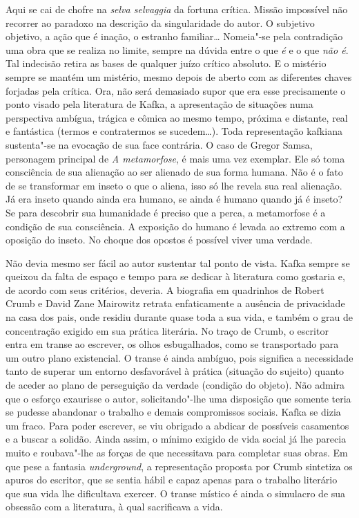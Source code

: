Aqui se cai de chofre na \textit{selva selvaggia} da fortuna crítica.
Missão impossível não recorrer ao paradoxo na descrição da
singularidade do autor. O subjetivo objetivo, a ação que é inação, o
estranho familiar\ldots{} Nomeia"-se pela contradição uma obra que se
realiza no limite, sempre na dúvida entre o que \textit{é} e o que
\textit{não é}. Tal indecisão retira as bases de qualquer juízo crítico
absoluto. E o mistério sempre se mantém um mistério, mesmo depois de
aberto com as diferentes chaves forjadas pela crítica. Ora, não será
demasiado supor que era esse precisamente o ponto visado pela
literatura de Kafka, a apresentação de situações numa perspectiva
ambígua, trágica e cômica ao mesmo tempo, próxima e distante, real e
fantástica (termos e contratermos se sucedem\ldots{}). Toda representação
kafkiana sustenta"-se na evocação de sua face contrária. O caso de Gregor
Samsa, personagem principal de \textit{A metamorfose}, é mais uma vez
exemplar. Ele só toma consciência de sua alienação ao ser alienado de
sua forma humana. Não é o fato de se transformar em inseto o que o
aliena, isso só lhe revela sua real alienação. Já era inseto quando
ainda era humano, se ainda é humano quando já é inseto? 
Se para descobrir sua humanidade é
preciso que a perca, a metamorfose é a condição de sua consciência. A
exposição do humano é levada ao extremo com a oposição do inseto. No
choque dos opostos é possível viver uma verdade.

Não devia mesmo ser fácil ao autor sustentar tal ponto de vista. Kafka
sempre se queixou da falta de espaço e tempo para se dedicar à
literatura como gostaria e, de acordo com seus critérios, deveria. A
biografia em quadrinhos de Robert Crumb e David Zane
Mairowitz retrata enfaticamente a ausência de
privacidade na casa dos pais, onde residiu durante quase toda a sua
vida, e também o grau de concentração exigido em sua prática literária.
No traço de Crumb, o escritor entra em transe ao escrever, os olhos
esbugalhados, como se transportado para um outro plano existencial. O
transe é ainda ambíguo, pois significa a necessidade tanto de superar
um entorno desfavorável à prática (situação do sujeito) quanto de
aceder ao plano de perseguição da verdade (condição do objeto). Não
admira que o esforço exaurisse o autor, solicitando"-lhe uma
disposição que somente teria se pudesse abandonar o trabalho e demais
compromissos sociais. Kafka se dizia um fraco. Para poder escrever, se
viu obrigado a abdicar de possíveis casamentos e a buscar a solidão.
Ainda assim, o mínimo exigido de vida social já lhe parecia muito e
roubava"-lhe as forças de que necessitava para completar suas obras.
Em que pese a fantasia \textit{underground}, a representação proposta
por Crumb sintetiza os apuros do escritor, que se sentia hábil e capaz
apenas para o trabalho literário que sua vida lhe dificultava exercer.
O transe místico é ainda o simulacro de sua obsessão com a literatura,
à qual sacrificava a vida.

